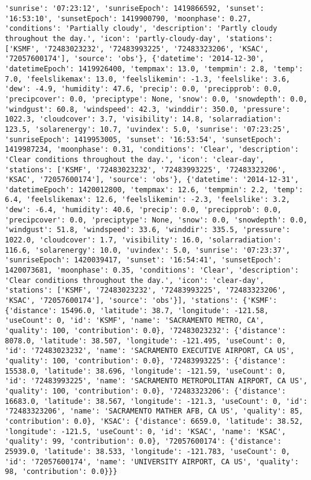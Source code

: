 \documentclass[
  letterpaper,
  DIV=11,
  numbers=noendperiod]{scrartcl}
\begin{document}
\begin{verbatim}
'sunrise': '07:23:12', 'sunriseEpoch': 1419866592, 'sunset': '16:53:10', 'sunsetEpoch': 1419900790, 'moonphase': 0.27, 'conditions': 'Partially cloudy', 'description': 'Partly cloudy throughout the day.', 'icon': 'partly-cloudy-day', 'stations': ['KSMF', '72483023232', '72483993225', '72483323206', 'KSAC', '72057600174'], 'source': 'obs'}, {'datetime': '2014-12-30', 'datetimeEpoch': 1419926400, 'tempmax': 13.0, 'tempmin': 2.8, 'temp': 7.0, 'feelslikemax': 13.0, 'feelslikemin': -1.3, 'feelslike': 3.6, 'dew': -4.9, 'humidity': 47.6, 'precip': 0.0, 'precipprob': 0.0, 'precipcover': 0.0, 'preciptype': None, 'snow': 0.0, 'snowdepth': 0.0, 'windgust': 60.8, 'windspeed': 42.3, 'winddir': 350.0, 'pressure': 1022.3, 'cloudcover': 3.7, 'visibility': 14.8, 'solarradiation': 123.5, 'solarenergy': 10.7, 'uvindex': 5.0, 'sunrise': '07:23:25', 'sunriseEpoch': 1419953005, 'sunset': '16:53:54', 'sunsetEpoch': 1419987234, 'moonphase': 0.31, 'conditions': 'Clear', 'description': 'Clear conditions throughout the day.', 'icon': 'clear-day', 'stations': ['KSMF', '72483023232', '72483993225', '72483323206', 'KSAC', '72057600174'], 'source': 'obs'}, {'datetime': '2014-12-31', 'datetimeEpoch': 1420012800, 'tempmax': 12.6, 'tempmin': 2.2, 'temp': 6.4, 'feelslikemax': 12.6, 'feelslikemin': -2.3, 'feelslike': 3.2, 'dew': -6.4, 'humidity': 40.6, 'precip': 0.0, 'precipprob': 0.0, 'precipcover': 0.0, 'preciptype': None, 'snow': 0.0, 'snowdepth': 0.0, 'windgust': 51.8, 'windspeed': 33.6, 'winddir': 335.5, 'pressure': 1022.0, 'cloudcover': 1.7, 'visibility': 16.0, 'solarradiation': 116.6, 'solarenergy': 10.0, 'uvindex': 5.0, 'sunrise': '07:23:37', 'sunriseEpoch': 1420039417, 'sunset': '16:54:41', 'sunsetEpoch': 1420073681, 'moonphase': 0.35, 'conditions': 'Clear', 'description': 'Clear conditions throughout the day.', 'icon': 'clear-day', 'stations': ['KSMF', '72483023232', '72483993225', '72483323206', 'KSAC', '72057600174'], 'source': 'obs'}], 'stations': {'KSMF': {'distance': 15496.0, 'latitude': 38.7, 'longitude': -121.58, 'useCount': 0, 'id': 'KSMF', 'name': 'SACRAMENTO METRO, CA', 'quality': 100, 'contribution': 0.0}, '72483023232': {'distance': 8078.0, 'latitude': 38.507, 'longitude': -121.495, 'useCount': 0, 'id': '72483023232', 'name': 'SACRAMENTO EXECUTIVE AIRPORT, CA US', 'quality': 100, 'contribution': 0.0}, '72483993225': {'distance': 15538.0, 'latitude': 38.696, 'longitude': -121.59, 'useCount': 0, 'id': '72483993225', 'name': 'SACRAMENTO METROPOLITAN AIRPORT, CA US', 'quality': 100, 'contribution': 0.0}, '72483323206': {'distance': 16683.0, 'latitude': 38.567, 'longitude': -121.3, 'useCount': 0, 'id': '72483323206', 'name': 'SACRAMENTO MATHER AFB, CA US', 'quality': 85, 'contribution': 0.0}, 'KSAC': {'distance': 6659.0, 'latitude': 38.52, 'longitude': -121.5, 'useCount': 0, 'id': 'KSAC', 'name': 'KSAC', 'quality': 99, 'contribution': 0.0}, '72057600174': {'distance': 25939.0, 'latitude': 38.533, 'longitude': -121.783, 'useCount': 0, 'id': '72057600174', 'name': 'UNIVERSITY AIRPORT, CA US', 'quality': 98, 'contribution': 0.0}}}
\end{verbatim}
\end{document}

